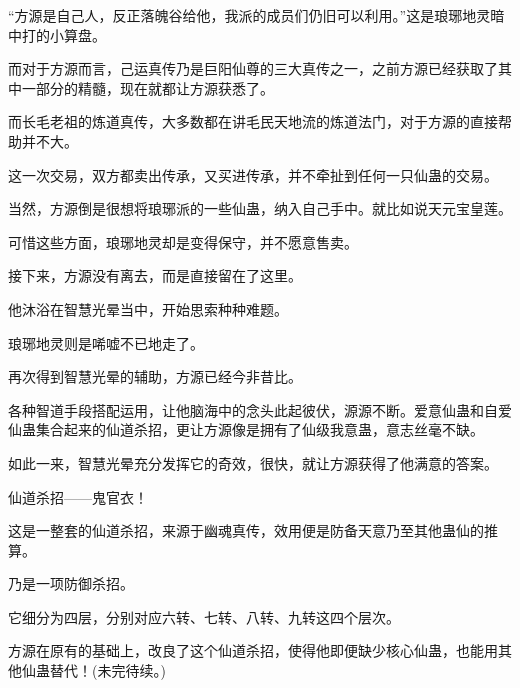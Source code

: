 \begin{this_body}
“方源是自己人，反正落魄谷给他，我派的成员们仍旧可以利用。”这是琅琊地灵暗中打的小算盘。

而对于方源而言，己运真传乃是巨阳仙尊的三大真传之一，之前方源已经获取了其中一部分的精髓，现在就都让方源获悉了。

而长毛老祖的炼道真传，大多数都在讲毛民天地流的炼道法门，对于方源的直接帮助并不大。

这一次交易，双方都卖出传承，又买进传承，并不牵扯到任何一只仙蛊的交易。

当然，方源倒是很想将琅琊派的一些仙蛊，纳入自己手中。就比如说天元宝皇莲。

可惜这些方面，琅琊地灵却是变得保守，并不愿意售卖。

接下来，方源没有离去，而是直接留在了这里。

他沐浴在智慧光晕当中，开始思索种种难题。

琅琊地灵则是唏嘘不已地走了。

再次得到智慧光晕的辅助，方源已经今非昔比。

各种智道手段搭配运用，让他脑海中的念头此起彼伏，源源不断。爱意仙蛊和自爱仙蛊集合起来的仙道杀招，更让方源像是拥有了仙级我意蛊，意志丝毫不缺。

如此一来，智慧光晕充分发挥它的奇效，很快，就让方源获得了他满意的答案。

仙道杀招——鬼官衣！

这是一整套的仙道杀招，来源于幽魂真传，效用便是防备天意乃至其他蛊仙的推算。

乃是一项防御杀招。

它细分为四层，分别对应六转、七转、八转、九转这四个层次。

方源在原有的基础上，改良了这个仙道杀招，使得他即便缺少核心仙蛊，也能用其他仙蛊替代！(未完待续。)

\end{this_body}

